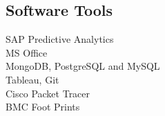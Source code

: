 \subsection{Software Tools}
SAP Predictive Analytics \\
MS Office \\
MongoDB, PostgreSQL and MySQL \\
Tableau, Git \\
Cisco Packet Tracer \\
BMC Foot Prints \\

\sectionspace %
